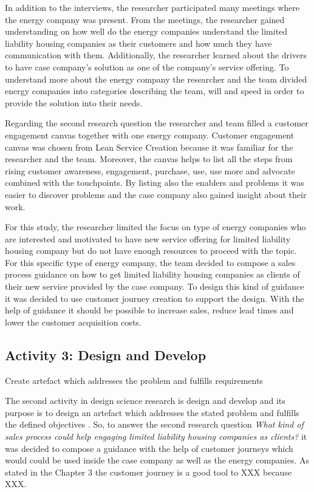 In addition to the interviews, the researcher participated many meetings where the energy company was present. From the meetings, the researcher gained understanding on how well do the energy companies understand the limited liability housing companies as their customers and how much they have communication with them. Additionally, the researcher learned about the drivers to have case company's solution as one of the company's service offering. To understand more about the energy company the researcher and the team divided energy companies into categories describing the team, will and speed in order to provide the solution into  their needs.

Regarding the second research question the researcher and team filled a customer engagement canvas together with one energy company. Customer engagement canvas was chosen from Lean Service Creation because it was familiar for the researcher and the team. Moreover, the canvas helps to list all the steps from rising customer awareness, engagement, purchase, use, use more and advocate combined with the touchpoints. By listing also the enablers and problems it was easier to discover problems and the case company also gained insight about their work. 

For this study, the researcher limited the focus on type of energy companies who are interested and motivated to have new service offering for limited liability housing company but do not have enough resources to proceed with the topic. For this specific type of energy company, the team decided to compose a sales process guidance on how to get limited liability housing companies as clients of their new service provided by the case company. To design this kind of guidance it was decided to use customer journey creation to support the design. With the help of guidance it should be possible to increase sales, reduce lead times and lower the customer acquisition costs.

\subsection{Activity 3: Design and Develop}
Create artefact which addresses the problem and fulfills requirements

The second activity in design science research is design and develop and its purpose is to design an artefact which addresses the stated problem and fulfills the defined objectives \parencite{Johannesson:2014}. So, to answer the second research question \emph{What kind of sales process could help engaging limited liability housing companies as clients?} it was decided to compose a guidance with the help of customer journeys which would could be used inside the case company as well as the energy companies. As stated in the Chapter 3 the customer journey is a good tool to XXX because XXX.

